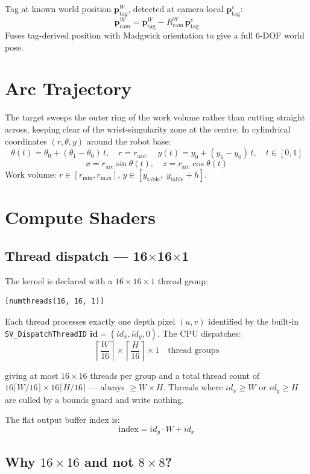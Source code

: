 \documentclass[11pt,a4paper]{article}
\begin{document}
Tag at known world position $\mathbf{p}_\text{tag}^W$, detected at camera-local $\mathbf{p}_\text{tag}^c$:
\[
\mathbf{p}_\text{cam}^W = \mathbf{p}_\text{tag}^W - R_\text{cam}^W\,\mathbf{p}_\text{tag}^c
\]
Fuses tag-derived position with Madgwick orientation to give a full 6-DOF world pose.

\section{Arc Trajectory}

The target sweeps the outer ring of the work volume rather than cutting straight
across, keeping clear of the wrist-singularity zone at the centre.
In cylindrical coordinates $(r,\theta,y)$ around the robot base:
\[
\theta(t) = \theta_0 + (\theta_1-\theta_0)\,t, \quad
r = r_\text{arc}, \quad
y(t) = y_0 + (y_1-y_0)\,t, \quad t\in[0,1]
\]
\[
x = r_\text{arc}\sin\theta(t), \quad z = r_\text{arc}\cos\theta(t)
\]
Work volume: $r \in [r_{\min}, r_{\max}]$, $y \in [y_\text{table},\; y_\text{table}+h]$.


\section{Compute Shaders}

\subsection{Thread dispatch — 16$\times$16$\times$1}

The kernel is declared with a $16\times16\times1$ thread group:
\begin{verbatim}
[numthreads(16, 16, 1)]
\end{verbatim}

Each thread processes exactly one depth pixel $(u,v)$ identified by the built-in
\texttt{SV\_DispatchThreadID} $\mathbf{id} = (id_x, id_y, 0)$.
The CPU dispatches:
\[
\left\lceil \frac{W}{16} \right\rceil \times \left\lceil \frac{H}{16} \right\rceil \times 1
\quad \text{thread groups}
\]

giving at most $16\times16$ threads per group and a total thread count of
$16\lceil W/16\rceil \times 16\lceil H/16\rceil$ — always $\geq W{\times}H$.
Threads where $id_x \geq W$ or $id_y \geq H$ are culled by a
bounds guard and write nothing.

The flat output buffer index is:
\[
\text{index} = id_y \cdot W + id_x
\]

\subsection{Why $16\times16$ and not $8\times8$?}
\end{document}
